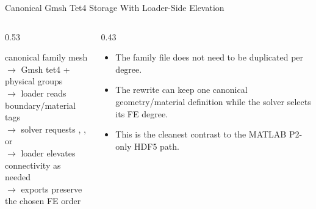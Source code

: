\documentclass[aspectratio=169,10pt]{beamer}
\begin{document}
\begin{frame}{Canonical Gmsh Tet4 Storage With Loader-Side Elevation}
\small
\begin{columns}[T,totalwidth=\textwidth]
\begin{column}{0.53\textwidth}
\begin{pseudobox}
canonical family mesh\\
$\rightarrow$ Gmsh tet4 + physical groups\\
$\rightarrow$ loader reads boundary/material tags\\
$\rightarrow$ solver requests , , or \\
$\rightarrow$ loader elevates connectivity as needed\\
$\rightarrow$ exports preserve the chosen FE order
\end{pseudobox}
\end{column}
\begin{column}{0.43\textwidth}
\begin{softbox}
\begin{itemize}
  \item The family file does not need to be duplicated per degree.
  \item The rewrite can keep one canonical geometry/material definition while the solver selects its FE degree.
  \item This is the cleanest contrast to the MATLAB P2-only HDF5 path.
\end{itemize}
\end{softbox}
\end{column}
\end{columns}
\end{frame}
\end{document}
